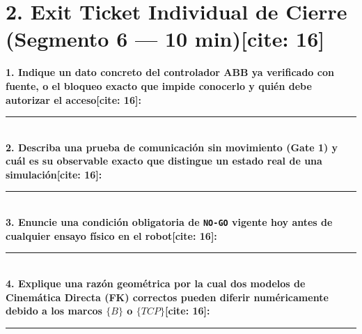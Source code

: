 \documentclass[10pt, a4paper, landscape]{article}
\begin{document}
\vspace{0.2cm}
\section*{2. Exit Ticket Individual de Cierre (Segmento 6 — 10 min)[cite: 16]}
\begin{tcolorbox}[colback=white, colframe=ucbblue, title=\textbf{Verificación Individual de Salida — Estudiante:} \rule{7cm}{0.15mm} \textbf{Grupo:} \rule{2cm}{0.15mm} {[cite: 16]}, left=2mm, right=2mm, top=1.5mm, bottom=1.5mm]
    \scriptsize\raggedright
    \textbf{1. Indique un dato concreto del controlador ABB ya verificado con fuente, o el bloqueo exacto que impide conocerlo y quién debe autorizar el acceso[cite: 16]:}\\[0.35cm]
    \rule{\textwidth}{0.15mm}\\[0.25cm]
    \textbf{2. Describa una prueba de comunicación sin movimiento (Gate 1) y cuál es su observable exacto que distingue un estado real de una simulación[cite: 16]:}\\[0.35cm]
    \rule{\textwidth}{0.15mm}\\[0.25cm]
    \textbf{3. Enuncie una condición obligatoria de \texttt{NO-GO} vigente hoy antes de cualquier ensayo físico en el robot[cite: 16]:}\\[0.35cm]
    \rule{\textwidth}{0.15mm}\\[0.25cm]
    \textbf{4. Explique una razón geométrica por la cual dos modelos de Cinemática Directa (FK) correctos pueden diferir numéricamente debido a los marcos $\{B\}$ o $\{TCP\}$[cite: 16]:}\\[0.35cm]
    \rule{\textwidth}{0.15mm}
\end{tcolorbox}
\end{document}
